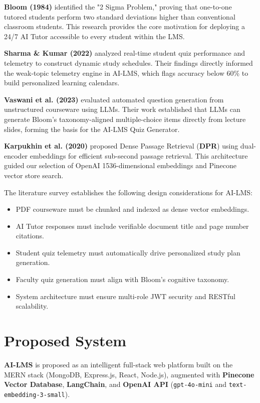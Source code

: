 \textbf{Bloom (1984)} identified the "2 Sigma Problem," proving that one-to-one tutored students perform two standard deviations higher than conventional classroom students. This research provides the core motivation for deploying a 24/7 AI Tutor accessible to every student within the LMS.

\textbf{Sharma \& Kumar (2022)} analyzed real-time student quiz performance and telemetry to construct dynamic study schedules. Their findings directly informed the weak-topic telemetry engine in AI-LMS, which flags accuracy below 60\% to build personalized learning calendars.

\textbf{Vaswani et al. (2023)} evaluated automated question generation from unstructured courseware using LLMs. Their work established that LLMs can generate Bloom's taxonomy-aligned multiple-choice items directly from lecture slides, forming the basis for the AI-LMS Quiz Generator.

\textbf{Karpukhin et al. (2020)} proposed Dense Passage Retrieval (\textbf{DPR}) using dual-encoder embeddings for efficient sub-second passage retrieval. This architecture guided our selection of OpenAI 1536-dimensional embeddings and Pinecone vector store search.

The literature survey establishes the following design considerations for AI-LMS:
\begin{itemize}
    \item PDF courseware must be chunked and indexed as dense vector embeddings.
    \item AI Tutor responses must include verifiable document title and page number citations.
    \item Student quiz telemetry must automatically drive personalized study plan generation.
    \item Faculty quiz generation must align with Bloom's cognitive taxonomy.
    \item System architecture must ensure multi-role JWT security and RESTful scalability.
\end{itemize}

\section{Proposed System}

\textbf{AI-LMS} is proposed as an intelligent full-stack web platform built on the MERN stack (MongoDB, Express.js, React, Node.js), augmented with \textbf{Pinecone Vector Database}, \textbf{LangChain}, and \textbf{OpenAI API} (\texttt{gpt-4o-mini} and \texttt{text-embedding-3-small}).

